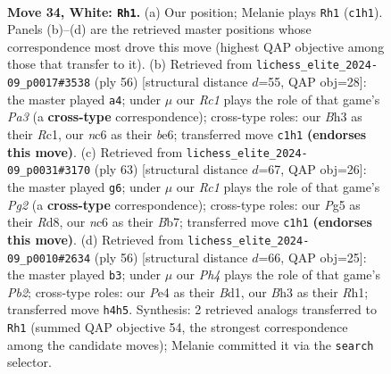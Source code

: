 \documentclass[11pt]{article}
\begin{document}
\clearpage

\begin{figure}[p]\centering
\begin{subfigure}{0.46\textwidth}\centering
\resizebox{\linewidth}{!}{%
\newchessgame
\chessboard[
  setfen={r3k2r/6bp/p1np2p1/4p1P1/1p2P2P/5PBB/PPPK4/R1R5 w - - 2 34},
  showmover=false,
  pgfstyle=straightmove, color=movearrow, markmove={c1-h1}
]}
\caption{}
\end{subfigure}\hfill
\begin{subfigure}{0.46\textwidth}\centering
\resizebox{\linewidth}{!}{%
\newchessgame
\chessboard[
  setfen={2k2r2/pp2n2r/4b1p1/3pPpP1/2pP3P/P1P2BP1/6K1/R1R5 w - - 3 29},
  showmover=false,
  pgfstyle=straightmove, color=movearrow, markmove={a3-a4}
]}
\caption{}
\end{subfigure}
\\[4pt]
\begin{subfigure}{0.46\textwidth}\centering
\resizebox{\linewidth}{!}{%
\newchessgame
\chessboard[
  setfen={3r1k2/1b2r1p1/p7/P3pp1p/2Bp4/3P1P1P/1PPR2P1/5RK1 b - - 0 32},
  showmover=false,
  pgfstyle=straightmove, color=movearrow, markmove={g7-g6}
]}
\caption{}
\end{subfigure}\hfill
\begin{subfigure}{0.46\textwidth}\centering
\resizebox{\linewidth}{!}{%
\newchessgame
\chessboard[
  setfen={rr4k1/3n1p2/p2p1bp1/2pPp3/N1P1P3/5P2/1P1B1K1R/3B3R w - - 1 29},
  showmover=false,
  pgfstyle=straightmove, color=movearrow, markmove={b2-b3}
]}
\caption{}
\end{subfigure}
\caption{\textbf{Move 34, White: \texttt{Rh1}.} (a) Our position; Melanie plays \texttt{Rh1} (\texttt{c1h1}). Panels (b)--(d) are the retrieved master positions whose correspondence most drove this move (highest QAP objective among those that transfer to it). (b) Retrieved from \texttt{lichess\_elite\_2024-09\_p0017\#3538} (ply 56) [structural distance $d$=55, QAP obj=28]: the master played \texttt{a4}; under $\mu$ our \emph{Rc1} plays the role of that game's \emph{Pa3} (a \textbf{cross-type} correspondence); cross-type roles: our \emph{B}h3 as their \emph{R}c1, our \emph{n}c6 as their \emph{b}e6; transferred move \texttt{c1h1} \textbf{(endorses this move)}. (c) Retrieved from \texttt{lichess\_elite\_2024-09\_p0031\#3170} (ply 63) [structural distance $d$=67, QAP obj=26]: the master played \texttt{g6}; under $\mu$ our \emph{Rc1} plays the role of that game's \emph{Pg2} (a \textbf{cross-type} correspondence); cross-type roles: our \emph{P}g5 as their \emph{R}d8, our \emph{n}c6 as their \emph{B}b7; transferred move \texttt{c1h1} \textbf{(endorses this move)}. (d) Retrieved from \texttt{lichess\_elite\_2024-09\_p0010\#2634} (ply 56) [structural distance $d$=66, QAP obj=25]: the master played \texttt{b3}; under $\mu$ our \emph{Ph4} plays the role of that game's \emph{Pb2}; cross-type roles: our \emph{P}e4 as their \emph{B}d1, our \emph{B}h3 as their \emph{R}h1; transferred move \texttt{h4h5}. Synthesis: 2 retrieved analogs transferred to \texttt{Rh1} (summed QAP objective 54, the strongest correspondence among the candidate moves); Melanie committed it via the \texttt{search} selector.}
\label{fig:thought-m66}
\end{figure}
\end{document}
